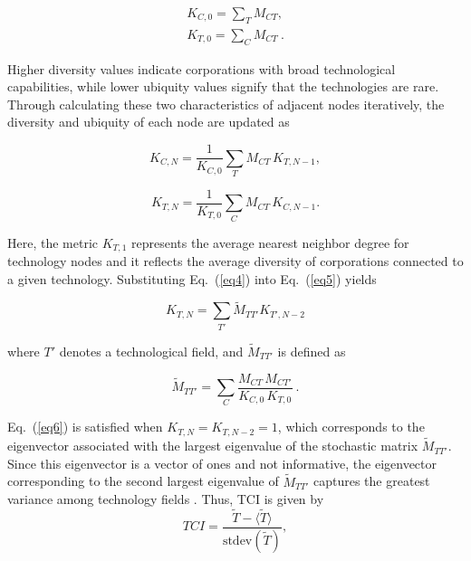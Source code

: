 \documentclass[lineno,pdflatex,sn-mathphys-num]{sn-jnl}%
\theoremstyle{thmstyleone}%
\theoremstyle{thmstyletwo}%
\theoremstyle{thmstylethree}%
\begin{document}
\begin{equation}\label{eq3}
\begin{aligned}
K_{C,0} = \sum_{T} M_{CT},  \\
K_{T,0} = \sum_{C} M_{CT}~.
\end{aligned}
\end{equation}

Higher diversity values indicate corporations with broad technological capabilities, while lower ubiquity values signify that the technologies are rare.
Through calculating these two characteristics of adjacent nodes iteratively, the diversity and ubiquity of each node are updated as

\begin{equation}\label{eq4}
K_{C,N} = \frac{1}{K_{C,0}} \sum_{T} M_{CT}\, K_{T,N-1},
\end{equation}

\begin{equation}\label{eq5}
K_{T,N} = \frac{1}{K_{T,0}} \sum_{C} M_{CT}\, K_{C,N-1}.
\end{equation}

Here, the metric \(K_{T,1}\) represents the average nearest neighbor degree for technology nodes and it reflects the average diversity of corporations connected to a given technology.
Substituting Eq.~(\ref{eq4}) into Eq.~(\ref{eq5}) yields

\begin{equation}\label{eq6}
K_{T,N} = \sum_{T'} \widetilde{M}_{TT'} K_{T',N-2}
\end{equation}

where \(T'\) denotes a technological field, and $\widetilde{M}_{TT'}$ is defined as

\begin{equation}\label{eq7}
\widetilde{M}_{TT'} = \sum_{C} \frac{M_{CT}\, M_{CT'}}{K_{C,0}\, K_{T,0}}~.
\end{equation}

Eq.~(\ref{eq6}) is satisfied when \(K_{T,N} = K_{T,N-2} = 1\), which corresponds to the eigenvector associated with the largest eigenvalue of the stochastic matrix \(\widetilde{M}_{TT'}\).
Since this eigenvector is a vector of ones and not informative, the eigenvector corresponding to the second largest eigenvalue of \(\widetilde{M}_{TT'}\) captures the greatest variance among technology fields \cite{Hidalgo2021, Mealy2019}.
Thus, TCI is given by
\begin{equation}\label{eq8}
TCI = \frac{\widetilde{T} - \langle \widetilde{T} \rangle}{\text{stdev}(\widetilde{T})},
\end{equation}
\end{document}
